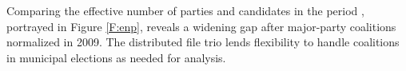 \documentclass[letter,12pt]{article}
\newcommand{\mc}{\multicolumn}
\begin{document}

Comparing the effective number of parties and candidates in the period \citep{laakso.taagepera.1979}, portrayed in Figure \ref{F:enp}, reveals a widening gap after major-party coalitions normalized in 2009. The distributed file trio lends flexibility to handle coalitions in municipal elections as needed for analysis.
\end{document}
